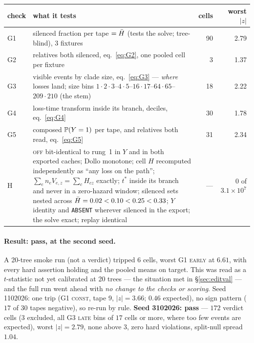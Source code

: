 \begin{center}\small
\begin{tabular}{@{}l p{} r r@{}}
\toprule
check & what it tests & cells & worst $|z|$ \\
\midrule
G1 & silenced fraction per tape $=\bar H$ (tests the solve; tree-blind), 3 fixtures         & 90 & 2.79 \\
G2 & relatives both silenced, eq.~\eqref{eq:G2}, one pooled cell per fixture                & 3  & 1.37 \\
G3 & visible events by clade size, eq.~\eqref{eq:G3} --- \emph{where} losses land; size bins
     $1\cdot2\cdot3$--$4\cdot5$--$16\cdot17$--$64\cdot65$--$209\cdot210$ (the stem)           & 18 & 2.22 \\
G4 & loss-time transform inside its branch, deciles, eq.~\eqref{eq:G4}                     & 30 & 1.78 \\
G5 & composed $\mathbb{P}(Y=1)$ per tape, and relatives both read, eq.~\eqref{eq:G5}             & 31 & 2.34 \\
H  & \textsc{off} bit-identical to rung~1 in $Y$ and in both exported caches; Dollo monotone; cell $H$
     recomputed independently as ``any loss on the path''; $\sum_en_eV_{e,z}=\sum_cH_{cz}$ exactly;
     $t^*$ inside its branch and never in a zero-hazard window; silenced sets nested across
     $\bar H=0.02<0.10<0.25<0.33$; $Y$ identity and \texttt{ABSENT} wherever silenced in the export;
     the solve exact; replay identical
   & --- & $0$ of $3.1{\times}10^{7}$ \\
\bottomrule
\end{tabular}
\end{center}

\paragraph{Result: pass, at the second seed.} A 20-tree smoke run (not a verdict) tripped $6$ cells,
worst G1 \textsc{early} at $6.61$, with every hard assertion holding and the pooled means on target.
This was read as a $t$-statistic not yet calibrated at 20 trees --- the situation met in
\S\ref{sec:editval} --- and the full run went ahead with \emph{no change to the checks or scoring}. Seed
1102026: one trip (G1 \textsc{const}, tape 9, $|z|=3.66$; $0.46$ expected), no sign pattern ($17$ of
$30$ tapes negative), so re-run by rule. \textbf{Seed 3102026: pass} --- $172$ verdict cells ($3$
excluded, all G3 \textsc{late} bins of $17$ cells or more, where too few events are expected), worst
$|z|=2.79$, none above $3$, zero hard violations, split-null spread $1.04$.

